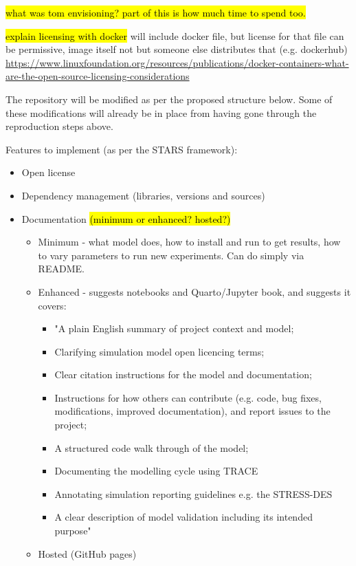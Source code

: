 \hl{what was tom envisioning? part of this is how much time to spend too.}

\hl{explain licensing with docker} will include docker file, but license for that file can be permissive, image itself not but someone else distributes that (e.g. dockerhub) \url{https://www.linuxfoundation.org/resources/publications/docker-containers-what-are-the-open-source-licensing-considerations}

The repository will be modified as per the proposed structure below. Some of these modifications will already be in place from having gone through the reproduction steps above.

Features to implement (as per the STARS framework):
\begin{itemize}
    \item Open license
    \item Dependency management (libraries, versions and sources)
    \item Documentation \hl{(minimum or enhanced? hosted?)}
    \begin{itemize}
        \item Minimum - what model does, how to install and run to get results, how to vary parameters to run new experiments. Can do simply via README.
        \item Enhanced - suggests notebooks and Quarto/Jupyter book, and suggests it covers:
        \begin{itemize}
            \item "A plain English summary of project context and model;
            \item Clarifying simulation model open licencing terms;
            \item Clear citation instructions for the model and documentation;
            \item Instructions for how others can contribute (e.g. code, bug fixes, modifications, improved documentation), and report issues to the project;
            \item A structured code walk through of the model;
            \item Documenting the modelling cycle using TRACE\autocite{ayllon_keeping_2021}
            \item Annotating simulation reporting guidelines  e.g. the STRESS-DES
            \item A clear description of model validation including its intended purpose"
        \end{itemize}
        \item Hosted (GitHub pages)

\end{itemize}
\end{itemize}
